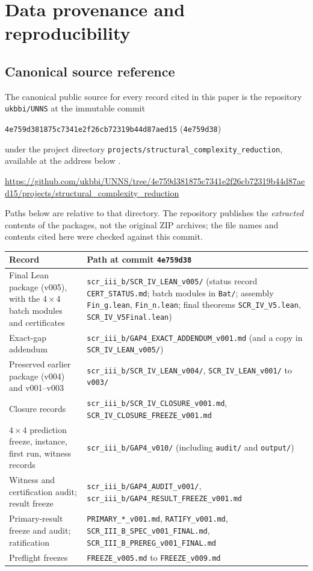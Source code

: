 \documentclass[11pt,a4paper]{article}
\theoremstyle{plain}
\theoremstyle{definition}
\theoremstyle{remark}
\newcommand{\lean}[1]{\nolinkurl{#1}}
\begin{document}
\appendix
\section{Data provenance and reproducibility}\label{app:prov}

\subsection{Canonical source reference}
The canonical public source for every record cited in this paper is the repository \texttt{ukbbi/UNNS} at the immutable commit
\begin{center}\small\texttt{4e759d381875c7341e2f26cb72319b44d87aed15} (\texttt{4e759d38})\end{center}
under the project directory \lean{projects/structural_complexity_reduction}, available at the address below \cite{UNNSRepo2026}.
\begin{center}\scriptsize\url{https://github.com/ukbbi/UNNS/tree/4e759d381875c7341e2f26cb72319b44d87aed15/projects/structural_complexity_reduction}\end{center}
 Paths below are relative to that directory. The repository publishes the \emph{extracted} contents of the packages, not the original ZIP archives; the file names and contents cited here were checked against this commit.

\begin{center}\small
\begin{tabularx}{\linewidth}{@{}p{5.3cm}X@{}}
\toprule
Record & Path at commit \texttt{4e759d38}\\
\midrule
Final Lean package (v005), with the $4\times4$ batch modules and certificates & \lean{scr_iii_b/SCR_IV_LEAN_v005/} (status record \lean{CERT_STATUS.md}; batch modules in \lean{Bat/}; assembly \lean{Fin_g.lean}, \lean{Fin_n.lean}; final theorems \lean{SCR_IV_V5.lean}, \lean{SCR_IV_V5Final.lean})\\
Exact-gap addendum & \lean{scr_iii_b/GAP4_EXACT_ADDENDUM_v001.md} (and a copy in \lean{SCR_IV_LEAN_v005/})\\
Preserved earlier package (v004) and v001--v003 & \lean{scr_iii_b/SCR_IV_LEAN_v004/}, \lean{SCR_IV_LEAN_v001/} to \lean{v003/}\\
Closure records & \lean{scr_iii_b/SCR_IV_CLOSURE_v001.md}, \lean{SCR_IV_CLOSURE_FREEZE_v001.md}\\
$4\times4$ prediction freeze, instance, first run, witness records & \lean{scr_iii_b/GAP4_v010/} (including \lean{audit/} and \lean{output/})\\
Witness and certification audit; result freeze & \lean{scr_iii_b/GAP4_AUDIT_v001/}, \lean{scr_iii_b/GAP4_RESULT_FREEZE_v001.md}\\
Primary-result freeze and audit; ratification & \lean{PRIMARY_*_v001.md}, \lean{RATIFY_v001.md}, \lean{SCR_III_B_SPEC_v001_FINAL.md}, \lean{SCR_III_B_PREREG_v001_FINAL.md}\\
Preflight freezes & \lean{FREEZE_v005.md} to \lean{FREEZE_v009.md}\\
\bottomrule
\end{tabularx}
\end{center}
\end{document}
